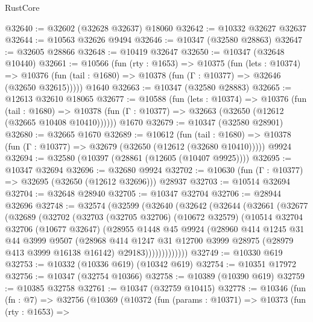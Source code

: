 \begin{lexlean}{RustCore}
\begin{coremodule}
@32640 := @32602 (@32628 @32637) @18060
@32642 := @10332 @32627 @32637
@32644 := @10563 @32626 @9494
@32646 := @10347 (@32580 @28863)
@32647 := @32605 @28866
@32648 := @10419 @32647
@32650 := @10347 (@32648 @10440)
@32661 := @10566
    (fun (rty : @1653) =>
    @10375
      (fun (lets : @10374) =>
      @10376 (fun (tail : @1680) => @10378 (fun (Γ : @10377) => @32646 (@32650 @32615)))))
    @1640
@32663 := @10347 (@32580 @28883)
@32665 := @12613 @32610 @18065
@32677 := @10588
    (fun (lets : @10374) =>
    @10376
      (fun (tail : @1680) =>
      @10378 (fun (Γ : @10377) => @32663 (@32650 (@12612 (@32665 @10408 @10410))))))
    @1670
@32679 := @10347 (@32580 @28901)
@32680 := @32665 @1670
@32689 := @10612
    (fun (tail : @1680) => @10378 (fun (Γ : @10377) => @32679 (@32650 (@12612 (@32680 @10410)))))
    @9924
@32694 := @32580 (@10397 (@28861 (@12605 (@10407 @9925))))
@32695 := @10347 @32694
@32696 := @32680 @9924
@32702 := @10630 (fun (Γ : @10377) => @32695 (@32650 (@12612 @32696))) @28937
@32703 := @10514 @32694
@32704 := @32648 @28940
@32705 := @10347 @32704
@32706 := @28944 @32696
@32748 := @32574
    (@32599
      (@32640
        (@32642
          (@32644
            (@32661
              (@32677
                (@32689
                  (@32702
                    (@32703
                      (@32705 @32706)
                      (@10672 @32579)
                      (@10514
                        @32704
                        @32706
                        (@10677 @32647)
                        (@28955
                          @1448
                          @45
                          @9924
                          (@28960
                            @414
                            @1245
                            @31
                            @44
                            @3999
                            @9507
                            (@28968
                              @414
                              @1247
                              @31
                              @12700
                              @3999
                              @28975
                              (@28979 @413 @3999 @16138 @16142)
                              @29183)))))))))))))
@32749 := @10330 @619
@32753 := @10332 (@10336 @619) (@10342 @619)
@32754 := @10351 @17972
@32756 := @10347 (@32754 @10366)
@32758 := @10389 (@10390 @619)
@32759 := @10385 @32758
@32761 := @10347 (@32759 @10415)
@32778 := @10346
    (fun (fn : @7) =>
    @32756
      (@10369
        (@10372
          (fun (params : @10371) =>
          @10373
            (fun (rty : @1653) =>

\end{coremodule}
\end{lexlean}
